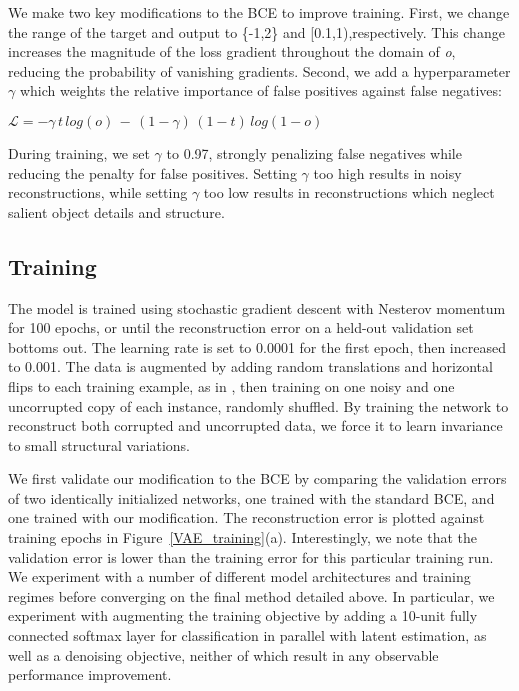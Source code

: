 \documentclass{article}
\begin{document}
We make two key modifications to the BCE to improve training. First, we change the range of the target and output to \{-1,2\} and [0.1,1),respectively. This change increases the magnitude of the loss gradient throughout the domain of \textit{o}, reducing the probability of vanishing gradients. Second, we add a hyperparameter $\gamma$ which weights the relative importance of false positives against false negatives:

\begin{center}$\mathcal{L} = -\gamma\,t\,log(o)\,-\,(1-\gamma)\,(1-t)\,log(1-o)$\end{center}

During training, we set $\gamma$ to 0.97, strongly penalizing false negatives while reducing the penalty for false positives. Setting $\gamma$ too high results in noisy reconstructions, while setting $\gamma$ too low results in reconstructions which neglect salient object details and structure.

\subsection{Training}

The model is trained using stochastic gradient descent with Nesterov momentum \citep{Nesterov} for 100 epochs, or until the reconstruction error on a held-out validation set bottoms out. The learning rate is set to 0.0001 for the first epoch, then increased to 0.001. The data is augmented by adding random translations and horizontal flips to each training example, as in \citep{VoxNet}, then training on one noisy and one uncorrupted copy of each instance, randomly shuffled. By training the network to reconstruct both corrupted and uncorrupted data, we force it to learn invariance to small structural variations.

We first validate our modification to the BCE by comparing the validation errors of two identically initialized networks, one trained with the standard BCE, and one trained with our modification. The reconstruction error is plotted against training epochs in Figure~\ref{VAE_training}(a). Interestingly, we note that the validation error is lower than the training error for this particular training run. We experiment with a number of different model architectures and training regimes before converging on the final method detailed above. In particular, we experiment with augmenting the training objective by adding a 10-unit fully connected softmax layer for classification in parallel with latent estimation, as well as a denoising objective, neither of which result in any observable performance improvement.
\end{document}
